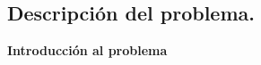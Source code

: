 \subsection{Descripción del problema.}

\vspace*{0.3cm}



\textbf{Introducción al problema} \newline


\vspace*{0.3cm}



